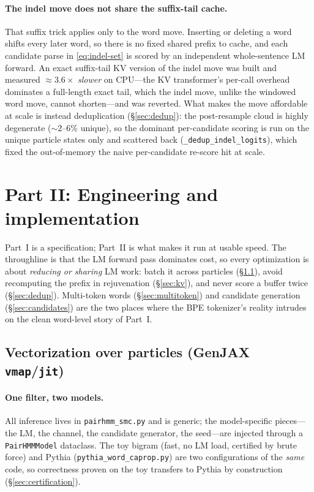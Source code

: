 \documentclass[11pt]{article}
\providecommand{\code}[1]{\texttt{#1}}
\begin{document}
\paragraph{The indel move does not share the suffix-tail cache.} That suffix trick applies only to the word move. Inserting or deleting a word shifts every later word, so there is no fixed shared prefix to cache, and each candidate parse in \eqref{eq:indel-set} is scored by an independent whole-sentence LM forward. An exact suffix-tail KV version of the indel move was built and measured $\approx 3.6\times$ \emph{slower} on CPU---the KV transformer's per-call overhead dominates a full-length exact tail, which the indel move, unlike the windowed word move, cannot shorten---and was reverted. What makes the move affordable at scale is instead deduplication (\S\ref{sec:dedup}): the post-resample cloud is highly degenerate ($\sim\!2$--$6\%$ unique), so the dominant per-candidate scoring is run on the unique particle states only and scattered back (\code{\_dedup\_indel\_logits}), which fixed the out-of-memory the naive per-candidate re-score hit at scale.

\section{Part II: Engineering and implementation}
\label{part:eng}

Part~I is a specification; Part~II is what makes it run at usable speed. The throughline is that the LM forward pass dominates cost, so every optimization is about \emph{reducing or sharing} LM work: batch it across particles (\S\ref{sec:vmap}), avoid recomputing the prefix in rejuvenation (\S\ref{sec:kv}), and never score a buffer twice (\S\ref{sec:dedup}). Multi-token words (\S\ref{sec:multitoken}) and candidate generation (\S\ref{sec:candidates}) are the two places where the BPE tokenizer's reality intrudes on the clean word-level story of Part~I.

\subsection{Vectorization over particles (GenJAX \texorpdfstring{\code{vmap}}{vmap}/\texorpdfstring{\code{jit}}{jit})}
\label{sec:vmap}

\paragraph{One filter, two models.} All inference lives in \code{pairhmm\_smc.py} and is generic; the model-specific pieces---the LM, the channel, the candidate generator, the seed---are injected through a \code{PairHMMModel} dataclass. The toy bigram (fast, no LM load, certified by brute force) and Pythia (\code{pythia\_word\_caprop.py}) are two configurations of the \emph{same} code, so correctness proven on the toy transfers to Pythia by construction (\S\ref{sec:certification}).
\end{document}
